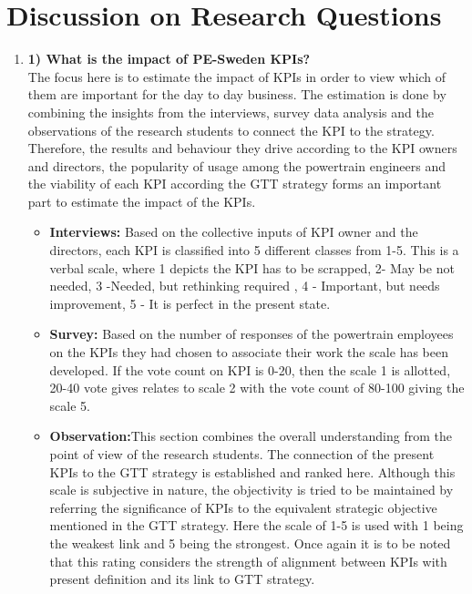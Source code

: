 \section{Discussion on Research Questions}
\begin{enumerate}
    \item \textbf{1) What is the impact of PE-Sweden KPIs?}\\
    The focus here is to estimate the impact of KPIs in order to view which of them are important for the day to day business. The estimation is done by combining the insights from the interviews, survey data analysis and the observations of the research students to connect the KPI to the strategy. Therefore, the results and behaviour they drive according to the KPI owners and directors, the popularity of usage among the powertrain engineers and the viability of each KPI according the GTT strategy forms an important part to estimate the impact of the KPIs.\\
    \begin{itemize}
        \item \textbf{Interviews:} Based on the collective inputs of KPI owner and the directors, each KPI is classified into 5 different classes from 1-5. This is a verbal scale, where 1 depicts the KPI has to be scrapped, 2- May be not needed, 3 -Needed, but rethinking required , 4 - Important, but needs improvement, 5 - It is perfect in the present state.
        \item \textbf{Survey:} Based on the number of responses of the powertrain employees on the KPIs they had chosen to associate their work the scale has been developed. If the vote count on KPI is 0-20, then the scale 1 is allotted, 20-40 vote gives relates to scale 2 with the vote count of 80-100 giving the scale 5.
        \item \textbf{Observation:}This section combines the overall understanding from the point of view of the research students. The connection of the present KPIs to the GTT strategy is established and ranked here. Although this scale is subjective in nature, the objectivity is tried to be maintained by referring the significance of KPIs to the equivalent strategic objective mentioned in the GTT strategy. Here the scale of 1-5 is used with 1 being the weakest link and 5 being the strongest. Once again it is to be noted that this rating considers the strength of alignment between KPIs with present definition and its link to GTT strategy.\\
    \end{itemize}

\end{enumerate}
